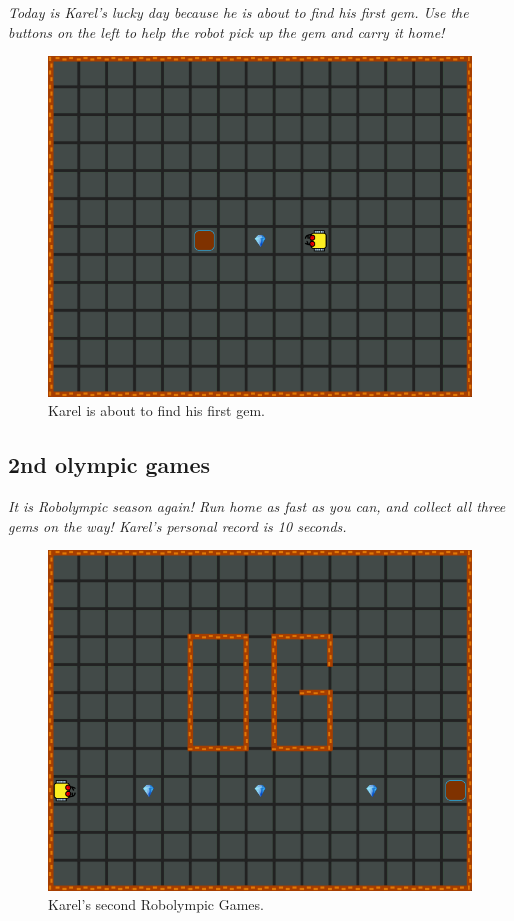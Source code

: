 {\em Today is Karel's lucky day because he is about to find his first gem. 
Use the buttons on the left to help the robot pick up the gem and carry it 
home!}

\begin{figure}[!ht]
\begin{center}
\includegraphics[height=0.4\textwidth]{img/a03.png}
\end{center}
\vspace{-4mm}
\caption{Karel is about to find his first gem.}
\label{fig:a03}
\vspace{-1cm}
\end{figure}
\noindent

\subsection{2nd olympic games}

{\em It is Robolympic season again! Run home as fast as you can, 
and collect all three gems on the way! Karel's personal record is 10 seconds.}


\begin{figure}[!ht]
\begin{center}
\includegraphics[height=0.4\textwidth]{img/a04.png}
\end{center}
\vspace{-4mm}
\caption{Karel's second Robolympic Games.}
\label{fig:a04}
\vspace{-1cm}
\end{figure}
\noindent


